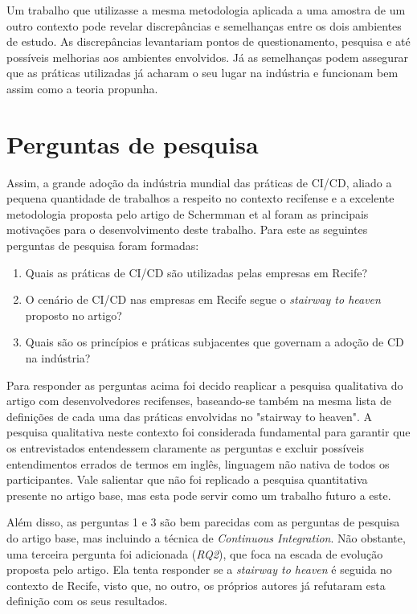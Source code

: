 Um trabalho que utilizasse a mesma metodologia aplicada a uma amostra de um outro contexto pode revelar discrepâncias e semelhanças entre os dois ambientes de estudo. As discrepâncias levantariam pontos de questionamento, pesquisa e até possíveis melhorias aos ambientes envolvidos. Já as semelhanças podem assegurar que as práticas utilizadas já acharam o seu lugar na indústria e funcionam bem assim como a teoria propunha.

\section{Perguntas de pesquisa} 
Assim, a grande adoção da indústria mundial das práticas de CI/CD, aliado a pequena quantidade de trabalhos a respeito no contexto recifense e a excelente metodologia proposta pelo artigo de Schermman et al \cite{empiricalStudy2016} foram as principais motivações para o desenvolvimento deste trabalho. Para este as seguintes perguntas de pesquisa foram formadas:

\begin{enumerate}
\item Quais as práticas de CI/CD são utilizadas pelas empresas em Recife?
\item O cenário de CI/CD nas empresas em Recife segue o \emph{stairway to heaven} proposto no artigo?
\item Quais são os princípios e práticas subjacentes que governam a adoção de CD na indústria?
\end{enumerate}

Para responder as perguntas acima foi decido reaplicar a pesquisa qualitativa do artigo \cite{empiricalStudy2016} com desenvolvedores recifenses, baseando-se também na mesma lista de definições de cada uma das práticas envolvidas no "stairway to heaven". A pesquisa qualitativa neste contexto foi considerada fundamental para garantir que os entrevistados entendessem claramente as perguntas e excluir possíveis entendimentos errados de termos em inglês, linguagem não nativa de todos os participantes. Vale salientar que não foi replicado a pesquisa quantitativa presente no artigo base, mas esta pode servir como um trabalho futuro a este.

Além disso, as perguntas 1 e 3 são bem parecidas com as perguntas de pesquisa do artigo base, mas incluindo a técnica de \emph{Continuous Integration}. Não obstante, uma terceira pergunta foi adicionada (\emph{RQ2}), que foca na escada de evolução proposta pelo artigo. Ela tenta responder se a \emph{stairway to heaven} é seguida no contexto de Recife, visto que, no outro, os próprios autores já refutaram esta definição com os seus resultados.


